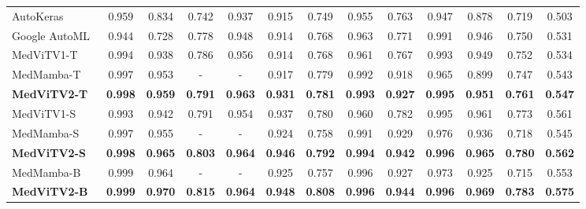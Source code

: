 \documentclass[times,twocolumn,final]{elsarticle}
\begin{document}
\begin{table*}[!htb]
\begin{center}
{\begin{tabular}{l||cc||cc||cc||cc||cc||cc}
            AutoKeras~\cite{jin2019auto}           & 0.959 & 0.834 & 0.742 & 0.937 & 0.915 & 0.749 & 0.955 & 0.763 & 0.947 & 0.878 & 0.719 & 0.503 \\
            Google AutoML~\cite{bisong2019google}  & 0.944 & 0.728 &  0.778 &  0.948 & 0.914 &  0.768 & {0.963} & 0.771 &  0.991 &  0.946 &  0.750 &  0.531 \\
            MedViTV1-T~\cite{manzari2023medvit}  &  {0.994} &  {0.938} &  0.786 &  {0.956} & 0.914 &  0.768 &  {0.961} & 0.767 &   {0.993} &   {0.949} &  0.752 &  0.534 \\
            MedMamba-T~\cite{yue2024medmamba} &  {0.997} &  {0.953} & - & - & 0.917 & 0.779 & 0.992 & 0.918 & 0.965 & 0.899 & 0.747 & 0.543 \\
            \rowcolor{gray!20}
            \textbf{MedViTV2-T} &  \textbf{0.998} &  \textbf{0.959} & \textbf{0.791} & \textbf{0.963} & \textbf{0.931} & \textbf{0.781} &  \textbf{0.993} & \textbf{0.927} & \textbf{0.995} & \textbf{0.951} & \textbf{0.761} & \textbf{0.547} \\
            \midrule

            MedViTV1-S~\cite{manzari2023medvit}  &  {0.993} &  {0.942} &   {0.791} &  0.954 &  {0.937} &  {0.780} &  0.960 &  {0.782} &   {0.995} &   {0.961} &   {0.773} &   {0.561} \\
            MedMamba-S~\cite{yue2024medmamba} & 0.997 & 0.955 & - & - & 0.924 & 0.758 & 0.991 & 0.929 & 0.976 & 0.936 & 0.718 & 0.545 \\
            \rowcolor{gray!20}
            \textbf{MedViTV2-S} &  \textbf{0.998} &  \textbf{0.965} &  \textbf{0.803} & \textbf{0.964} & \textbf{0.946} & \textbf{0.792} &  \textbf{0.994} & \textbf{0.942} & \textbf{0.996} & \textbf{0.965} & \textbf{0.780} & \textbf{0.562} \\
            \midrule

            MedMamba-B~\cite{yue2024medmamba} & 0.999 & 0.964 & - & -& 0.925 & 0.757 & 0.996 & 0.927 & 0.973 & 0.925 & 0.715 & 0.553 \\
            \rowcolor{gray!20}
            \textbf{MedViTV2-B} &  \textbf{0.999} &  \textbf{0.970} & \textbf{0.815} & \textbf{0.964} &
            \textbf{0.948} & \textbf{0.808} &  \textbf{0.996} & \textbf{0.944} & \textbf{0.996} & \textbf{0.969} & \textbf{0.783} & \textbf{0.575}\\
            \midrule


\end{tabular}}
\end{center}
\end{table*}
\end{document}
